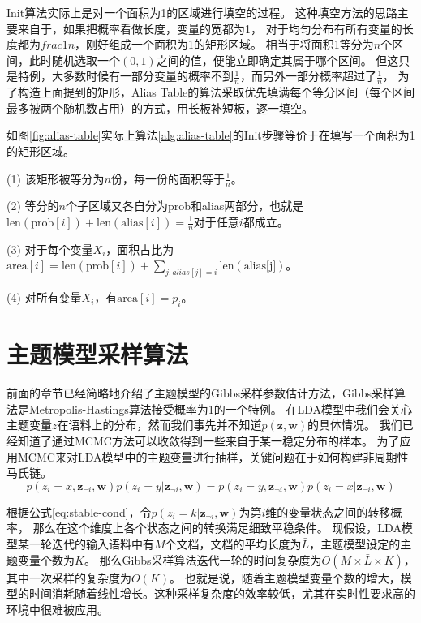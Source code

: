 Init算法实际上是对一个面积为1的区域进行填空的过程。
这种填空方法的思路主要来自于，如果把概率看做长度，变量的宽都为1，
对于均匀分布有所有变量的长度都为$frac{1}{n}$，刚好组成一个面积为1的矩形区域。
相当于将面积1等分为$n$个区间，此时随机选取一个$(0, 1)$之间的值，便能立即确定其属于哪个区间。
但这只是特例，大多数时候有一部分变量的概率不到$\frac{1}{n}$，而另外一部分概率超过了$\frac{1}{n}$，
为了构造上面提到的矩形，Alias Table的算法采取优先填满每个等分区间（每个区间最多被两个随机数占用）的方式，用长板补短板，逐一填空。

如图\ref{fig:alias-table}实际上算法\ref{alg:alias-table}的Init步骤等价于在填写一个面积为1的矩形区域。

(1) 该矩形被等分为$n$份，每一份的面积等于$\frac{1}{n}$。

(2) 等分的$n$个子区域又各自分为prob和alias两部分，也就是$\mbox{len}(\mbox{prob}[i]) +\mbox{len}( \mbox{alias}[i]) = \frac{1}{n}$对于任意$i$都成立。

(3) 对于每个变量$X_i$，面积占比为$\mbox{area}[i] = \mbox{len}(\mbox{prob}[i]) + \sum_{j, alias[j]=i}{\mbox{len}(\mbox{alias[j]})}$。

(4) 对所有变量$X_i$，有$\mbox{area}[i] = p_i$。

\section{主题模型采样算法}
前面的章节已经简略地介绍了主题模型的Gibbs采样参数估计方法，Gibbs采样算法是Metropolis-Hastings算法接受概率为1的一个特例。
在LDA模型中我们会关心主题变量$z$在语料上的分布，然而我们事先并不知道$p\mathbf{ (z, w)}$的具体情况。
我们已经知道了通过MCMC方法可以收敛得到一些来自于某一稳定分布的样本。
为了应用MCMC来对LDA模型中的主题变量进行抽样，关键问题在于如何构建非周期性马氏链。
\begin{equation}
\label{eq:stable-cond}
p(z_i = x , \mathbf{z}_{\neg i}, \mathbf{w}) p( z_i = y | \mathbf{z}_{\neg i},  \mathbf{w})  =  
p(z_i = y , \mathbf{z}_{\neg i}, \mathbf{w}) p( z_i = x | \mathbf{z}_{\neg i},  \mathbf{w}) 
\end{equation}

根据公式\ref{eq:stable-cond}，令$p( z_i = k | \mathbf{z}_{\neg i},  \mathbf{w})$为第$i$维的变量状态之间的转移概率，
那么在这个维度上各个状态之间的转换满足细致平稳条件。
现假设，LDA模型某一轮迭代的输入语料中有$M$个文档，文档的平均长度为$\bar{L}$，主题模型设定的主题变量个数为$K$。
那么Gibbs采样算法迭代一轮的时间复杂度为$O(M\times \bar{L} \times K)$，其中一次采样的复杂度为$O(K)$。
也就是说，随着主题模型变量个数的增大，模型的时间消耗随着线性增长。这种采样复杂度的效率较低，尤其在实时性要求高的环境中很难被应用。

